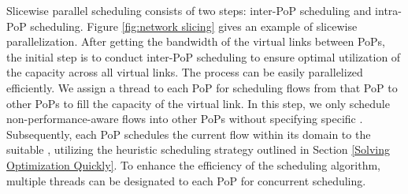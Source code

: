 



Slicewise parallel scheduling consists of two steps: inter-PoP scheduling and intra-PoP scheduling. Figure \ref{fig:network slicing} gives an example of slicewise parallelization. After getting the bandwidth of the virtual links between PoPs, the initial step is to conduct inter-PoP scheduling to ensure optimal utilization of the capacity across all virtual links. The process can be easily parallelized efficiently. We assign a thread to each PoP for scheduling flows from that PoP to other PoPs to fill the capacity of the virtual link. In this step, we only schedule non-performance-aware flows into other PoPs without specifying specific {\egress}. Subsequently, each PoP schedules the current flow within its domain to the suitable {\egress}, utilizing the heuristic scheduling strategy outlined in Section \ref{Solving Optimization Quickly}. To enhance the efficiency of the scheduling algorithm, multiple threads can be designated to each PoP for concurrent scheduling.

